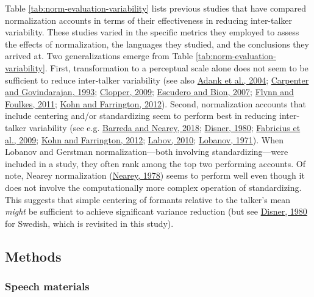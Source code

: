 \documentclass[utf8]{frontiersSCNS}
\begin{document}
Table \ref{tab:norm-evaluation-variability} lists previous studies that have compared normalization accounts in terms of their effectiveness in reducing inter-talker variability. These studies varied in the specific metrics they employed to assess the effects of normalization, the languages they studied, and the conclusions they arrived at. Two generalizations emerge from Table \ref{tab:norm-evaluation-variability}. First, transformation to a perceptual scale alone does not seem to be sufficient to reduce inter-talker variability (see also \protect\hyperlink{ref-adank2004}{Adank et al., 2004}; \protect\hyperlink{ref-carpenter1993}{Carpenter and Govindarajan, 1993}; \protect\hyperlink{ref-clopper2009}{Clopper, 2009}; \protect\hyperlink{ref-escudero2007}{Escudero and Bion, 2007}; \protect\hyperlink{ref-Flynn2011}{Flynn and Foulkes, 2011}; \protect\hyperlink{ref-kohn2012a}{Kohn and Farrington, 2012}). Second, normalization accounts that include centering and/or standardizing seem to perform best in reducing inter-talker variability (see e.g. \protect\hyperlink{ref-barreda2018a}{Barreda and Nearey, 2018}; \protect\hyperlink{ref-disner1980}{Disner, 1980}; \protect\hyperlink{ref-fabricius2009}{Fabricius et al., 2009}; \protect\hyperlink{ref-kohn2012a}{Kohn and Farrington, 2012}; \protect\hyperlink{ref-labov2010}{Labov, 2010}; \protect\hyperlink{ref-lobanov1971}{Lobanov, 1971}). When Lobanov and Gerstman normalization---both involving standardizing---were included in a study, they often rank among the top two performing accounts. Of note, Nearey normalization (\protect\hyperlink{ref-nearey1978}{Nearey, 1978}) seems to perform well even though it does not involve the computationally more complex operation of standardizing. This suggests that simple centering of formants relative to the talker's mean \emph{might} be sufficient to achieve significant variance reduction (but see \protect\hyperlink{ref-disner1980}{Disner, 1980} for Swedish, which is revisited in this study).

\hypertarget{sec:methodsI}{%
\subsection*{Methods}\label{sec:methodsI}}

\hypertarget{sec:speechMaterialsI}{%
\subsubsection*{Speech materials}\label{sec:speechMaterialsI}}
\end{document}

